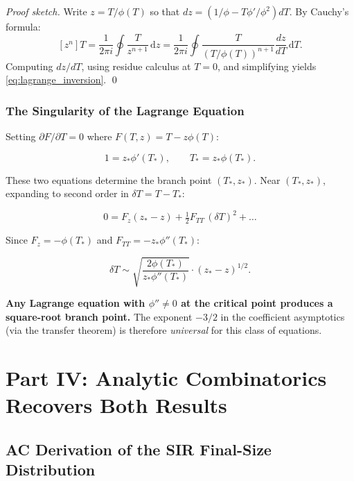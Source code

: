 \documentclass[11pt,a4paper]{article}
\theoremstyle{definition}
\newcommand{\diff}{\,\mathrm{d}}
\begin{document}
\begin{proof}[Proof sketch]
Write $z = T/\phi(T)$ so that $dz = (1/\phi - T\phi'/\phi^2)dT$. By Cauchy's formula:
\[
[z^n]T = \frac{1}{2\pi i}\oint \frac{T}{z^{n+1}}\diff z
= \frac{1}{2\pi i}\oint \frac{T}{\left(T/\phi(T)\right)^{n+1}}\frac{d z}{d T}\diff T.
\]
Computing $dz/dT$, using residue calculus at $T=0$, and simplifying yields
\eqref{eq:lagrange_inversion}. \qed
\end{proof}

\subsubsection{The Singularity of the Lagrange Equation}

Setting $\partial F/\partial T = 0$ where $F(T,z) = T - z\phi(T)$:

\begin{equation}
  1 = z_*\phi'(T_*), \qquad T_* = z_*\phi(T_*).
  \label{eq:lagrange_singular}
\end{equation}

These two equations determine the branch point $(T_*, z_*)$. Near $(T_*, z_*)$,
expanding to second order in $\delta T = T - T_*$:

\[
  0 = F_z(z_* - z) + \tfrac{1}{2}F_{TT}\,(\delta T)^2 + \ldots
\]

Since $F_z = -\phi(T_*)$ and $F_{TT} = -z_*\phi''(T_*)$:

\begin{equation}
  \delta T \sim \sqrt{\frac{2\phi(T_*)}{z_*\phi''(T_*)}}\cdot(z_* - z)^{1/2}.
  \label{eq:lagrange_sqrtbranch}
\end{equation}

\textbf{Any Lagrange equation with $\phi'' \neq 0$ at the critical point produces
a square-root branch point.} The exponent $-3/2$ in the coefficient asymptotics
(via the transfer theorem) is therefore \emph{universal} for this class of equations.

\clearpage

\section{Part IV: Analytic Combinatorics Recovers Both Results}
\label{sec:acrecovery}

\subsection{AC Derivation of the SIR Final-Size Distribution}
\end{document}
